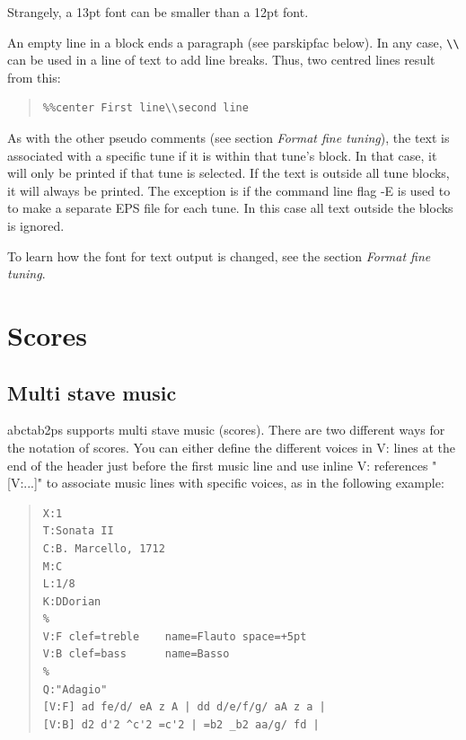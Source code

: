 \documentclass[a4paper]{article}
\begin{document}
Strangely, a 13pt font can be smaller than a 12pt font.
\par
An empty line in a block ends a paragraph (see parskipfac below).
In any case, \verb$\\$ can be used in a line of text to 
add line breaks. Thus, two centred lines result from this:
\begin{quote}
\begin{verbatim}
%%center First line\\second line
\end{verbatim}
\end{quote}
As with the other pseudo comments (see section {\it Format fine tuning}), 
the text is associated with a specific tune if it is within that tune's block.
In that case, it will only be printed if that tune is selected. 
If the text is outside all tune blocks, it will always be printed.
The exception is if the command line flag -E is used to to make a separate 
EPS file for each tune. In this case all text outside the blocks is ignored.
\par
To learn how the font for text output is changed, see the section
{\it Format fine tuning}.

\section{Scores}

\subsection{Multi stave music}
\label{sec:MultiStaveMusic}
abctab2ps supports multi stave music (scores). There are two different
ways for the notation of scores. You can either define the different
voices in V: lines at the end of the header just before the first music
line and use inline V: references "[V:...]" to associate music lines 
with specific voices, as in the following example:

\begin{quote}
\begin{verbatim}
X:1
T:Sonata II
C:B. Marcello, 1712
M:C
L:1/8
K:DDorian
%
V:F clef=treble    name=Flauto space=+5pt
V:B clef=bass      name=Basso  
%
Q:"Adagio"
[V:F] ad fe/d/ eA z A | dd d/e/f/g/ aA z a | 
[V:B] d2 d'2 ^c'2 =c'2 | =b2 _b2 aa/g/ fd | 
\end{verbatim}
\end{quote}
\end{document}
